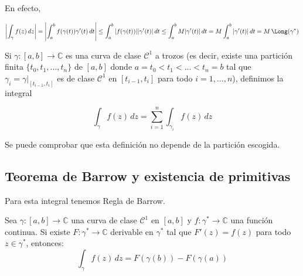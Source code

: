 En efecto,

\[
    \left| \int_{\gamma} f(z) \, dz \right| = \left| \int_a^b f(\gamma(t)) \gamma'(t) \, dt \right| \leq \int_a^b |f(\gamma(t))| |\gamma'(t)| \, dt \leq \int_a^b M|\gamma'(t)| \, dt = M \int_{a}^b |\gamma'(t)| \, dt = M \, \Long(\gamma^*)
\]


Si $\gamma : [a, b] \to \mathbb{C}$ es una curva de clase $\mathcal{C}^1$ a trozos (es decir, existe una partición finita $\{t_0, t_1, \ldots, t_n\}$ de $[a, b]$ donde $a = t_0 < t_1 < \ldots < t_n = b$ tal que $\gamma_i = \gamma|_{[t_{i-1}, t_i]}$ es de clase $\mathcal{C}^1$ en $[t_{i-1}, t_i]$ para todo $i = 1, \ldots, n$), definimos la integral 

\[
    \int_\gamma f(z) \, dz = \sum_{i=1}^n \int_{\gamma_i} f(z) \, dz
\]

Se puede comprobar que esta definición no depende de la partición escogida.

\subsection{Teorema de Barrow y existencia de primitivas}

Para esta integral tenemos Regla de Barrow.

\begin{teorema} 
    Sea $\gamma: [a, b] \to \mathbb{C}$ una curva de clase $\mathcal{C}^1$ en $[a, b]$ y $f: \gamma^* \to \mathbb{C}$ una función continua. Si existe $F: \gamma^* \to \mathbb{C}$ derivable en $\gamma^*$ tal que $F'(z) = f(z)$ para todo $z \in \gamma^*$, entonces:
    \[
        \int_\gamma f(z) \, dz = F(\gamma(b)) - F(\gamma(a))
    \]
\end{teorema}

